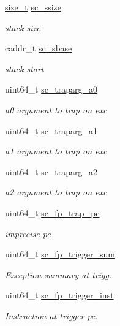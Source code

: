 \begin{DoxyCompactItemize}
\hyperlink{classTru64_a186ea1339bffb378854987065835afe3}{size\_\-t} \hyperlink{structTru64_1_1sigcontext_aae4918b0e1b1034786efbc691e13d776}{sc\_\-ssize}
\begin{DoxyCompactList}\small\item\em stack size \item\end{DoxyCompactList}\item 
caddr\_\-t \hyperlink{structTru64_1_1sigcontext_a2df71070c2e1f6c5afdea3223aa228a5}{sc\_\-sbase}
\begin{DoxyCompactList}\small\item\em stack start \item\end{DoxyCompactList}\item 
uint64\_\-t \hyperlink{structTru64_1_1sigcontext_aa2835095904203751c6ad8c601b1e976}{sc\_\-traparg\_\-a0}
\begin{DoxyCompactList}\small\item\em a0 argument to trap on exc \item\end{DoxyCompactList}\item 
uint64\_\-t \hyperlink{structTru64_1_1sigcontext_a3d0b9c34979fb5ffe689ad3c89725d38}{sc\_\-traparg\_\-a1}
\begin{DoxyCompactList}\small\item\em a1 argument to trap on exc \item\end{DoxyCompactList}\item 
uint64\_\-t \hyperlink{structTru64_1_1sigcontext_aeb3bf4e999feccefabeb886ebd6aa8f8}{sc\_\-traparg\_\-a2}
\begin{DoxyCompactList}\small\item\em a2 argument to trap on exc \item\end{DoxyCompactList}\item 
uint64\_\-t \hyperlink{structTru64_1_1sigcontext_ab10a3d10e3fe65f63611c9a40a8d2f38}{sc\_\-fp\_\-trap\_\-pc}
\begin{DoxyCompactList}\small\item\em imprecise pc \item\end{DoxyCompactList}\item 
uint64\_\-t \hyperlink{structTru64_1_1sigcontext_ac63ae298a0894715703d0df20f66043b}{sc\_\-fp\_\-trigger\_\-sum}
\begin{DoxyCompactList}\small\item\em Exception summary at trigg. \item\end{DoxyCompactList}\item 
uint64\_\-t \hyperlink{structTru64_1_1sigcontext_a64e94a086e3a5973c5eb9bf5412fe9cb}{sc\_\-fp\_\-trigger\_\-inst}
\begin{DoxyCompactList}\small\item\em Instruction at trigger pc. \item\end{DoxyCompactList}\end{DoxyCompactItemize}


